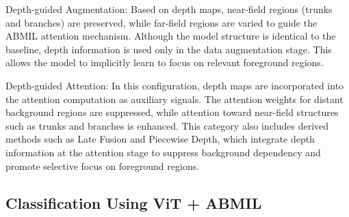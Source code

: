 \noindent Depth-guided Augmentation:\quad
Based on depth maps, near-field regions (trunks and branches) are preserved, while far-field regions are varied to guide the ABMIL attention mechanism. Although the model structure is identical to the baseline, depth information is used only in the data augmentation stage. This allows the model to implicitly learn to focus on relevant foreground regions.

\noindent Depth-guided Attention:\quad
In this configuration, depth maps are incorporated into the attention computation as auxiliary signals. The attention weights for distant background regions are suppressed, while attention toward near-field structures such as trunks and branches is enhanced. This category also includes derived methods such as Late Fusion and Piecewise Depth, which integrate depth information at the attention stage to suppress background dependency and promote selective focus on foreground regions.

\subsection{Classification Using ViT + ABMIL}
